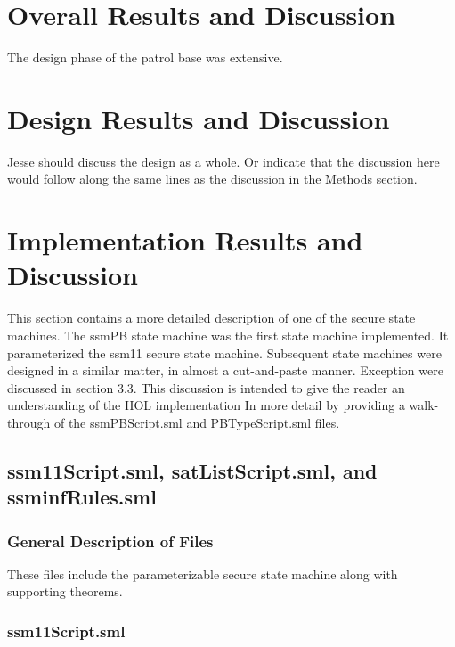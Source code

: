 


\section{Overall Results and Discussion}
\label{sec:over-results-disc}

The design phase of the patrol base was extensive.

\section{Design Results and Discussion}
\label{sec:design-results-disc}

Jesse should discuss the design as a whole. Or indicate that the discussion here would follow
along the same lines as the discussion in the Methods section.

\section{Implementation Results and Discussion}
\label{sec:impl-results-disc}

This section contains a more detailed description of one of the secure state machines. The ssmPB
state machine was the first state machine implemented. It parameterized the ssm11 secure state machine.
Subsequent state machines were designed in a similar matter, in almost a cut-and-paste manner.
Exception were discussed in section 3.3. This discussion is intended to give the reader an understanding
of the HOL implementation In more detail by providing a walk-through of the ssmPBScript.sml and PBTypeScript.sml
files.

\subsection{ssm11Script.sml, satListScript.sml, and ssminfRules.sml}
\label{sec:ssm11scr-satl-ssminf}

\subsubsection{General Description of Files}
\label{sec:gener-descr-files}

These files include the parameterizable secure state machine along with supporting theorems.

\subsubsection{ssm11Script.sml}
\label{sec:ssm11script.sml}

